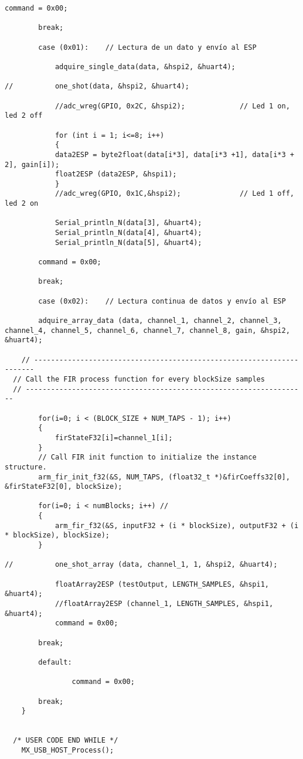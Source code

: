 \begin{lstlisting}[label=algoritmo:main.c,style = STM-code,frame=single,caption=main.c]
			command = 0x00;
			
		break;
			
		case (0x01):	// Lectura de un dato y envío al ESP
		
			adquire_single_data(data, &hspi2, &huart4);
			
//			one_shot(data, &hspi2, &huart4);
		
			//adc_wreg(GPIO, 0x2C, &hspi2);				// Led 1 on, led 2 off	
			
			for (int i = 1; i<=8; i++)
			{					
			data2ESP = byte2float(data[i*3], data[i*3 +1], data[i*3 + 2], gain[i]);
			float2ESP (data2ESP, &hspi1);
			}
			//adc_wreg(GPIO, 0x1C,&hspi2);				// Led 1 off, led 2 on			
			
			Serial_println_N(data[3], &huart4);
			Serial_println_N(data[4], &huart4);
			Serial_println_N(data[5], &huart4);
			
		command = 0x00;
				
		break;
		
		case (0x02):	// Lectura continua de datos y envío al ESP
			
		adquire_array_data (data, channel_1, channel_2, channel_3, channel_4, channel_5, channel_6, channel_7, channel_8, gain, &hspi2, &huart4);

	// ----------------------------------------------------------------------
  // Call the FIR process function for every blockSize samples
  // ------------------------------------------------------------------- 
  
		for(i=0; i < (BLOCK_SIZE + NUM_TAPS - 1); i++) 
		{
			firStateF32[i]=channel_1[i];
		}
		// Call FIR init function to initialize the instance structure. 
		arm_fir_init_f32(&S, NUM_TAPS, (float32_t *)&firCoeffs32[0], &firStateF32[0], blockSize);
		
		for(i=0; i < numBlocks; i++) //
		{
			arm_fir_f32(&S, inputF32 + (i * blockSize), outputF32 + (i * blockSize), blockSize);
		}
		
//			one_shot_array (data, channel_1, 1, &hspi2, &huart4);
			
			floatArray2ESP (testOutput, LENGTH_SAMPLES, &hspi1, &huart4);
			//floatArray2ESP (channel_1, LENGTH_SAMPLES, &hspi1, &huart4);
			command = 0x00;
				
		break;
			
		default:
			
				command = 0x00;
		
		break;
	}
	
		
  /* USER CODE END WHILE */
    MX_USB_HOST_Process();


\end{lstlisting}
